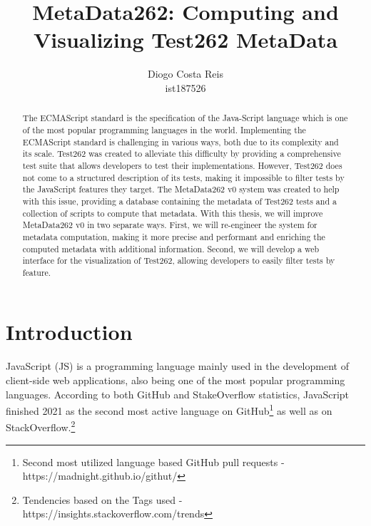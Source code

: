 \documentclass[runningheads]{llncs}
\title{MetaData262: Computing and Visualizing Test262 MetaData}
\subtitle{}
\author{Diogo Costa Reis\\ist187526\\
\email{diogo.costa.reis@tecnico.ulisboa.pt}}
\institute{Instituto Superior Técnico\\
Av. Rovisco Pais, 1\\
1049-001 Lisboa\\
Tel: +351 218 417 000\\
\email{mail@tecnico.ulisboa.pt}}
\begin{document}
{\def\addcontentsline#1#2#3{}\maketitle}

%
\begin{abstract}
The ECMAScript standard is the specification of the Java-Script language which is one of the most popular programming languages in the world. Implementing the ECMAScript standard is challenging in various ways, both due to its complexity and its scale. Test262 was created to alleviate this difficulty by providing a comprehensive test suite that allows developers to test their implementations. 
%
However, Test262 does not come to a structured description of its tests, making it impossible to filter tests by the JavaScript features they target. The MetaData262 v0 system was created to help with this issue, providing a database containing the metadata of Test262 tests and a collection of scripts to compute that metadata.
%
With this thesis, we will improve MetaData262 v0 in two separate ways. First, we will re-engineer the system for metadata computation, making it more precise and performant and enriching the computed metadata with additional information. Second, we will develop a web interface for the visualization of Test262, allowing developers to easily filter tests by feature. 

\end{abstract}


\newpage

\tableofcontents

\newpage

\section{Introduction}
\label{sec:Introduction}


JavaScript (JS) is a programming language mainly used in the development of client-side web applications, also being one of the most popular programming languages. According to both GitHub and StakeOverflow statistics, JavaScript finished 2021 as the second most active language on GitHub\footnote{Second most utilized language based GitHub pull requests - https://madnight.github.io/githut/} as well as on StackOverflow.\footnote{Tendencies based on the Tags used - https://insights.stackoverflow.com/trends}
\end{document}
